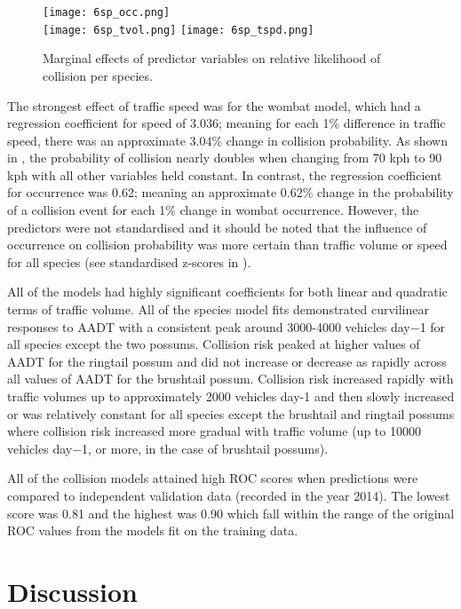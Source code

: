 \begin{figure*}[htp]
  \centering
  \texttt{[image: 6sp\_occ.png]}\\
  \texttt{[image: 6sp\_tvol.png]}
  \texttt{[image: 6sp\_tspd.png]}
  \caption[Marginal effects of predictor variables on relative likelihood of collision for six mammal species]{Marginal effects of predictor variables on relative likelihood of collision per species.}
  \label{6sp_effects}
\end{figure*}

The strongest effect of traffic speed was for the wombat model, which had a regression coefficient for speed of 3.036; meaning for each 1\% difference in traffic speed, there was an approximate 3.04\% change in collision probability. As shown in , the probability of collision nearly doubles when changing from 70 kph to 90 kph with all other variables held constant. In contrast, the regression coefficient for occurrence was 0.62; meaning an approximate 0.62\% change in the probability of a collision event for each 1\% change in wombat occurrence. However, the predictors were not standardised and it should be noted that the influence of occurrence on collision probability was more certain than traffic volume or speed for all species (see standardised z-scores in ).

All of the models had highly significant coefficients for both linear and quadratic terms of traffic volume.  All of the species model fits demonstrated curvilinear responses to AADT with a consistent peak around 3000-4000 vehicles day−1 for all species except the two possums.  Collision risk peaked at higher values of AADT for the ringtail possum and did not increase or decrease as rapidly across all values of AADT for the brushtail possum.  Collision risk increased rapidly with traffic volumes up to approximately 2000 vehicles day-1 and then slowly increased or was relatively constant for all species except the brushtail and ringtail possums where collision risk increased more gradual with traffic volume (up to 10000 vehicles day−1, or more, in the case of brushtail possums).

All of the collision models attained high ROC scores when predictions were compared to independent validation data (recorded in the year 2014).  The lowest score was 0.81 and the highest was 0.90 which fall within the range of the original ROC values from the models fit on the training data.

\section{Discussion}

